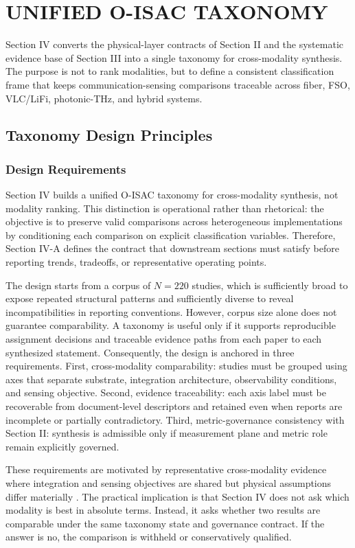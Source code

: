 \documentclass[lettersize,journal]{IEEEtran}
\begin{document}
\section{UNIFIED O-ISAC TAXONOMY}

Section IV converts the physical-layer contracts of Section II and the systematic evidence base of Section III into a single taxonomy for cross-modality synthesis. The purpose is not to rank modalities, but to define a consistent classification frame that keeps communication-sensing comparisons traceable across fiber, FSO, VLC/LiFi, photonic-THz, and hybrid systems.

\subsection{Taxonomy Design Principles}

\subsubsection{Design Requirements}
Section IV builds a unified O-ISAC taxonomy for cross-modality synthesis, not modality ranking. This distinction is operational rather than rhetorical: the objective is to preserve valid comparisons across heterogeneous implementations by conditioning each comparison on explicit classification variables. Therefore, Section IV-A defines the contract that downstream sections must satisfy before reporting trends, tradeoffs, or representative operating points.

The design starts from a corpus of $N=220$ studies, which is sufficiently broad to expose repeated structural patterns and sufficiently diverse to reveal incompatibilities in reporting conventions. However, corpus size alone does not guarantee comparability. A taxonomy is useful only if it supports reproducible assignment decisions and traceable evidence paths from each paper to each synthesized statement. Consequently, the design is anchored in three requirements. First, cross-modality comparability: studies must be grouped using axes that separate substrate, integration architecture, observability conditions, and sensing objective. Second, evidence traceability: each axis label must be recoverable from document-level descriptors and retained even when reports are incomplete or partially contradictory. Third, metric-governance consistency with Section II: synthesis is admissible only if measurement plane and metric role remain explicitly governed.

These requirements are motivated by representative cross-modality evidence where integration and sensing objectives are shared but physical assumptions differ materially \cite{O_ISAC_006,O_ISAC_021,O_ISAC_068,O_ISAC_016}. The practical implication is that Section IV does not ask which modality is best in absolute terms. Instead, it asks whether two results are comparable under the same taxonomy state and governance contract. If the answer is no, the comparison is withheld or conservatively qualified.
\end{document}
